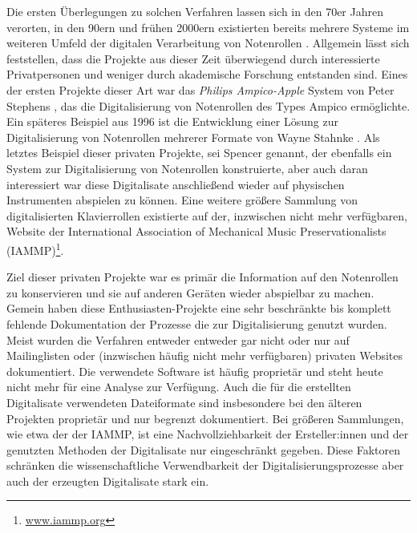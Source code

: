 Die ersten Überlegungen zu solchen Verfahren lassen sich in den 70er Jahren verorten, in den 90ern und frühen 2000ern existierten bereits mehrere Systeme im weiteren Umfeld der digitalen Verarbeitung von Notenrollen \autocite[]{colmenares_2011}.
Allgemein lässt sich feststellen, dass die Projekte aus dieser Zeit überwiegend durch interessierte Privatpersonen und weniger durch akademische Forschung entstanden sind.
Eines der ersten Projekte dieser Art war das \textit{Philips Ampico-Apple} System von Peter Stephens \parencite*[]{stephens}, das die Digitalisierung von Notenrollen des Types Ampico ermöglichte.
Ein späteres Beispiel aus 1996 ist die Entwicklung einer Lösung zur Digitalisierung von Notenrollen mehrerer Formate von Wayne Stahnke \parencite[]{stahnke_1996}.
Als letztes Beispiel dieser privaten Projekte, sei Spencer \textcite[]{chase_2003} genannt, der ebenfalls ein System zur Digitalisierung von Notenrollen konstruierte, aber auch daran interessiert war diese Digitalisate anschließend wieder auf physischen Instrumenten abspielen zu können.
Eine weitere größere Sammlung von digitalisierten Klavierrollen existierte auf der, inzwischen nicht mehr verfügbaren, Website der International Association of Mechanical Music Preservationalists (IAMMP)\footnote{\href{http://www.iammp.org/}{www.iammp.org}}.

Ziel dieser privaten Projekte war es primär die Information auf den Notenrollen zu konservieren und sie auf anderen Geräten wieder abspielbar zu machen.
Gemein haben diese Enthusiasten-Projekte eine sehr beschränkte bis komplett fehlende Dokumentation der Prozesse die zur Digitalisierung genutzt wurden.
Meist wurden die Verfahren entweder entweder gar nicht oder nur auf Mailinglisten oder (inzwischen häufig nicht mehr verfügbaren) privaten Websites dokumentiert.
Die verwendete Software ist häufig proprietär und steht heute nicht mehr für eine Analyse zur Verfügung.
Auch die für die erstellten Digitalisate verwendeten Dateiformate sind insbesondere bei den älteren Projekten proprietär und nur begrenzt dokumentiert.
Bei größeren Sammlungen, wie etwa der der IAMMP, ist eine Nachvollziehbarkeit der Ersteller:innen und der genutzten Methoden der Digitalisate nur eingeschränkt gegeben.
Diese Faktoren schränken die wissenschaftliche Verwendbarkeit der Digitalisierungsprozesse aber auch der erzeugten Digitalisate stark ein.

